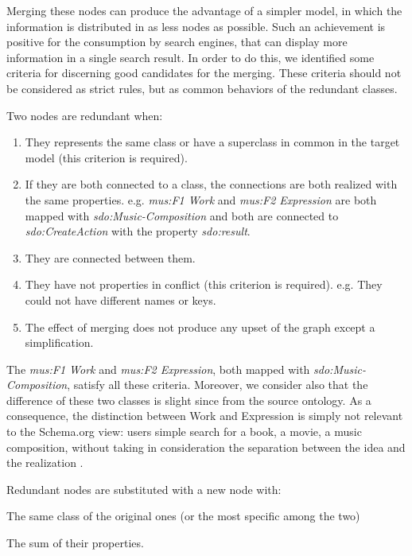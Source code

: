 \documentclass{llncs}
\begin{document}
Merging these nodes can produce the advantage of a simpler model, in which the information is distributed in as less nodes as possible. Such an achievement is positive for the consumption by search engines, that can display more information in a single search result. In order to do this, we identified some criteria for discerning good candidates for the merging. These criteria should not be considered as strict rules, but as common behaviors of the redundant classes.

Two nodes are redundant when:
\begin{enumerate}
\item{
They represents the same class or have a superclass in common in the target model (this criterion is required).
}
\item{
If they are both connected to a class, the connections are both realized with the same properties.\newline
e.g. \textit{mus:F1 Work} and \textit{mus:F2 Expression} are both mapped with \textit{sdo:Music-Composition} and both are connected to \textit{sdo:CreateAction} with the property \textit{sdo:result}.
}
\item{
They are connected between them.
}
\item{
They have not properties in conflict (this criterion is required). \newline
e.g. They could not have different names or keys.
}
\item{
The effect of merging does not produce any upset of the graph except a simplification.
}
\end{enumerate}

The \textit{mus:F1 Work} and \textit{mus:F2 Expression}, both mapped with \textit{sdo:Music-Composition}, satisfy all these criteria. Moreover, we consider also that the difference of these two classes is slight since from the source ontology. As a consequence, the distinction between Work and Expression is simply not relevant to the Schema.org view: users simple search for a book, a movie, a music composition, without taking in consideration the separation between the idea and the realization \cite{godby2013relationship}.

Redundant nodes are substituted with a new node with:
\begin{enumerate*}
\item{The same class of the original ones (or the most specific among the two)}
\item{The sum of their properties.}
\end{enumerate*}
\end{document}
